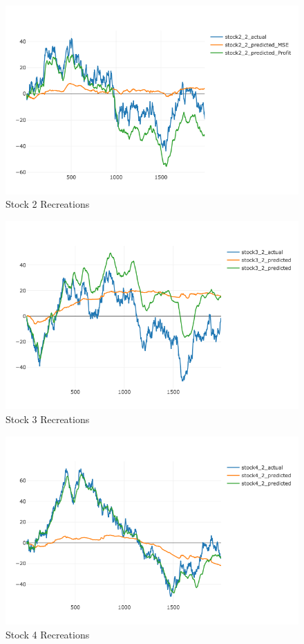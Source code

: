 \documentclass[a4paper,latin]{paper}
\begin{document}
\begin{figure}[H]
	\centering \includegraphics[scale=0.5]{images/synthetic_results/recreation_stock2.png}
	\caption{Stock 2 Recreations}
	\label{figure-synthetic-stock2-recreation}
\end{figure}

\begin{figure}[H]
	\centering \includegraphics[scale=0.5]{images/synthetic_results/recreation_stock3.png}
	\caption{Stock 3 Recreations}
	\label{figure-synthetic-stock3-recreation}
\end{figure}

\begin{figure}[H]
	\centering \includegraphics[scale=0.5]{images/synthetic_results/recreation_stock4.png}
	\caption{Stock 4 Recreations}
	\label{figure-synthetic-stock4-recreation}
\end{figure}
\end{document}
